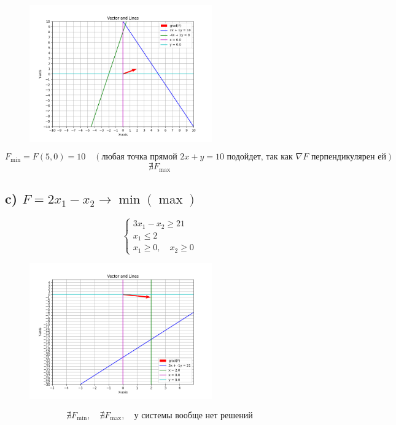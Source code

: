 \documentclass[17pt]{extarticle}
\begin{document}
\begin{figure}[H]
    \centering
    \includegraphics[width=0.7\textwidth]{b.png}
\end{figure}

\[
    F_{\min} = F(5, 0) = 10 \quad (\text{любая точка прямой } 2x + y = 10 \text{ подойдет, так как } \nabla F \text{ перпендикулярен ей})
\]
\[
    \nexists F_{\max}
\]

\subsection*{c) \( F = 2x_1 - x_2 \to \min (\max) \)}

\[
    \begin{cases}
        3x_1 - x_2 \geq 21 \\
        x_1 \leq 2         \\
        x_1 \geq 0, \quad x_2 \geq 0
    \end{cases}
\]

\begin{figure}[H]
    \centering
    \includegraphics[width=0.7\textwidth]{c.png}
\end{figure}

\[
    \nexists F_{\min}, \quad \nexists F_{\max}, \quad \text{у системы вообще нет решений}
\]
\end{document}
